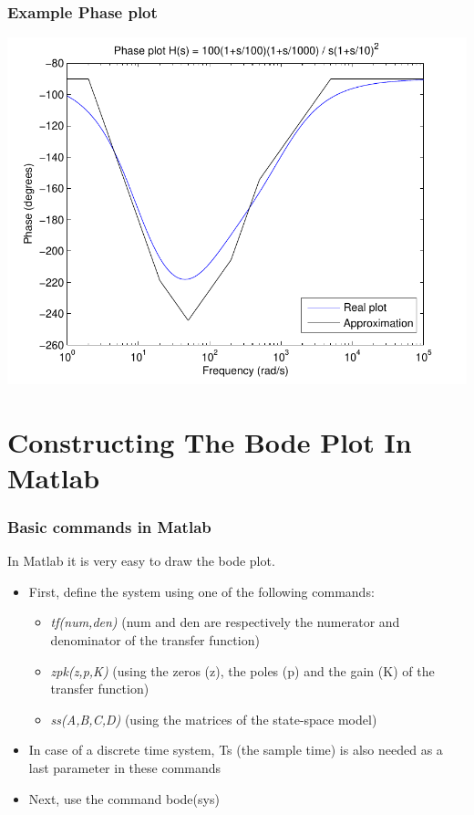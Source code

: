 \begin{frame}
\frametitle{Example Phase plot}

\begin{center}
\includegraphics[scale=0.5]{PhaseApprox}
\end{center}


\end{frame}

\section{Constructing The Bode Plot In Matlab}

\begin{frame}
\frametitle{Basic commands in Matlab}

In Matlab it is very easy to draw the bode plot.
\begin{itemize}
\item First, define the system using one of the following commands:
	\begin{itemize}
	\item \textit{tf(num,den)} (num and den are respectively the numerator and denominator of the transfer function)
	\item \textit{zpk(z,p,K)} (using the zeros (z), the poles (p) and the gain (K) of the transfer function)
	\item \textit{ss(A,B,C,D)} (using the matrices of the state-space model)

	\end{itemize}
\item In case of a discrete time system, Ts (the sample time) is also needed as a last parameter in these commands
\item Next, use the command bode(sys)

\end{itemize}

\end{frame}

